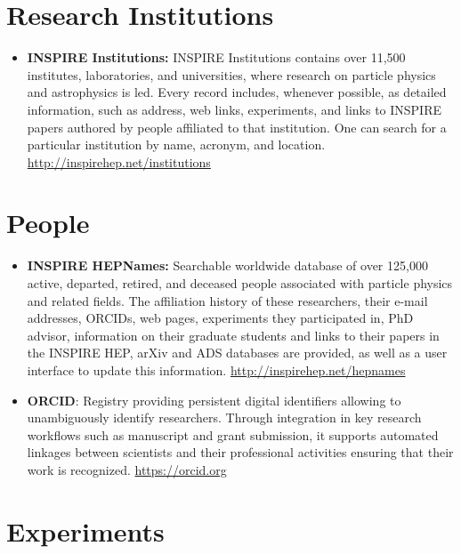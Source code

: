 \section{Research Institutions}\label{databases:sec:research}

\begin{itemize}
\tightlist
\item
  \textbf{INSPIRE Institutions:} INSPIRE Institutions contains over
  11,500 institutes, laboratories, and universities, where research on
  particle physics and astrophysics is led. Every record includes,
  whenever possible, as detailed information, such as address, web
  links, experiments, and links to INSPIRE papers authored by people
  affiliated to that institution. One can search for a particular
  institution by name, acronym, and location.
  \url{http://inspirehep.net/institutions}
\end{itemize}

\section{People}\label{databases:sec:people}

\begin{itemize}
\item
  \textbf{INSPIRE HEPNames:} Searchable worldwide database of over
  125,000 active, departed, retired, and deceased people associated with
  particle physics and related fields. The affiliation history of these
  researchers, their e-mail addresses, ORCIDs, web pages, experiments
  they participated in, PhD advisor, information on their graduate
  students and links to their papers in the INSPIRE HEP, arXiv and ADS
  databases are provided, as well as a user interface to update this
  information. \url{http://inspirehep.net/hepnames}
\item
  \textbf{ORCID}: Registry providing persistent digital identifiers
  allowing to unambiguously identify researchers. Through integration in
  key research workflows such as manuscript and grant submission, it
  supports automated linkages between scientists and their professional
  activities ensuring that their work is recognized.
  \url{https://orcid.org}
\end{itemize}

\section{Experiments}\label{databases:sec:experiments}

